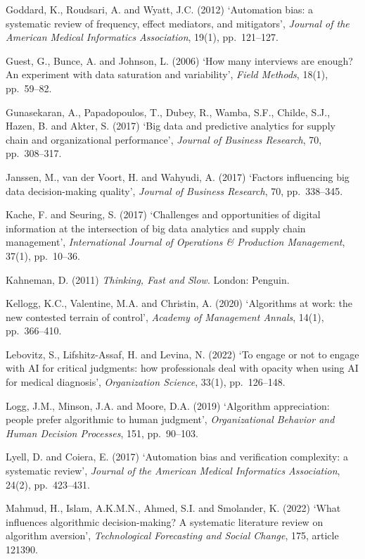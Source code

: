 \documentclass[11pt,a4paper]{article}
\numberwithin{figure}{section}
\numberwithin{table}{section}
\begin{document}
{Goddard, K., Roudsari, A. and Wyatt, J.C. (2012) `Automation bias: a systematic review of frequency,
effect mediators, and mitigators', \emph{Journal of the American Medical Informatics Association},
19(1), pp.~121--127.

Guest, G., Bunce, A. and Johnson, L. (2006) `How many interviews are enough? An experiment with data
saturation and variability', \emph{Field Methods}, 18(1), pp.~59--82.

Gunasekaran, A., Papadopoulos, T., Dubey, R., Wamba, S.F., Childe, S.J., Hazen, B. and Akter, S.
(2017) `Big data and predictive analytics for supply chain and organizational performance',
\emph{Journal of Business Research}, 70, pp.~308--317.

Janssen, M., van der Voort, H. and Wahyudi, A. (2017) `Factors influencing big data decision-making
quality', \emph{Journal of Business Research}, 70, pp.~338--345.

Kache, F. and Seuring, S. (2017) `Challenges and opportunities of digital information at the
intersection of big data analytics and supply chain management', \emph{International Journal of
Operations \& Production Management}, 37(1), pp.~10--36.

Kahneman, D. (2011) \emph{Thinking, Fast and Slow}. London: Penguin.

Kellogg, K.C., Valentine, M.A. and Christin, A. (2020) `Algorithms at work: the new contested
terrain of control', \emph{Academy of Management Annals}, 14(1), pp.~366--410.

Lebovitz, S., Lifshitz-Assaf, H. and Levina, N. (2022) `To engage or not to engage with AI for
critical judgments: how professionals deal with opacity when using AI for medical diagnosis',
\emph{Organization Science}, 33(1), pp.~126--148.

Logg, J.M., Minson, J.A. and Moore, D.A. (2019) `Algorithm appreciation: people prefer algorithmic
to human judgment', \emph{Organizational Behavior and Human Decision Processes}, 151, pp.~90--103.

Lyell, D. and Coiera, E. (2017) `Automation bias and verification complexity: a systematic review',
\emph{Journal of the American Medical Informatics Association}, 24(2), pp.~423--431.

Mahmud, H., Islam, A.K.M.N., Ahmed, S.I. and Smolander, K. (2022) `What influences algorithmic
decision-making? A systematic literature review on algorithm aversion', \emph{Technological
Forecasting and Social Change}, 175, article 121390.

}
\end{document}
